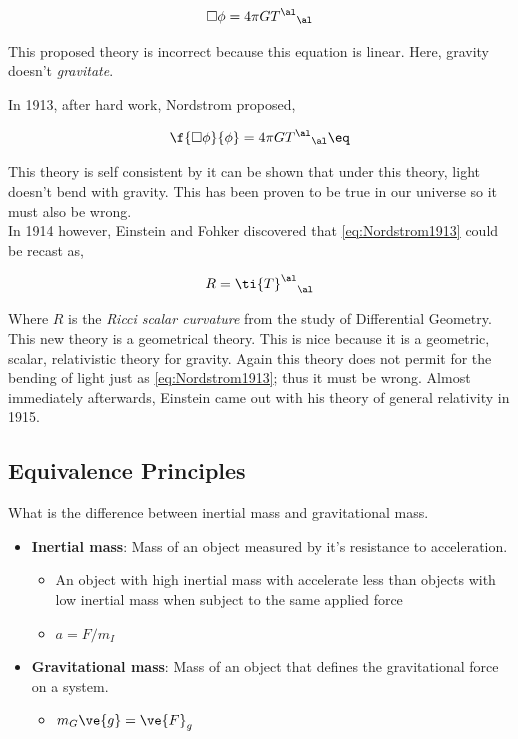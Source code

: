 \documentclass{article}
\begin{document}
\[ \Box \phi = 4 \pi G {T^{\al}}_{\al} \]

This proposed theory is incorrect because this equation is linear. Here, gravity doesn't \textit{gravitate}.

In 1913, after hard work, Nordstrom proposed,

\[ \f{\Box \phi}{\phi} = 4 \pi G {T^{\al}}_{\al} \eq \label{eq:Nordstrom1913}\]

This theory is self consistent by it can be shown that under this theory, light doesn't bend with gravity. This has been proven to be true in our universe so it must also be wrong. \\

In 1914 however, Einstein and Fohker discovered that \eqref{eq:Nordstrom1913} could be recast as,

\[ R = {\ti{T}^{\al}}_\al \]

Where $R$ is the \textit{Ricci scalar curvature} from the study of Differential Geometry. This new theory is a geometrical theory. This is nice because it is a geometric, scalar, relativistic theory for gravity. Again this theory does not permit for the bending of light just as \eqref{eq:Nordstrom1913}; thus it must be wrong. Almost immediately afterwards, Einstein came out with his theory of general relativity in 1915.

\subsection{Equivalence Principles}

What is the difference between inertial mass and gravitational mass.

\begin{itemize}
    \item \textbf{Inertial mass}: Mass of an object measured by it's resistance to acceleration.
    \begin{itemize}
        \item An object with high inertial mass with accelerate less than objects with low inertial mass when subject to the same applied force
        \item $a = F / m_I$
    \end{itemize}
    \item \textbf{Gravitational mass}: Mass of an object that defines the gravitational force on a system.
    \begin{itemize}
        \item $m_G \ve{g} = \ve{F}_g$
    \end{itemize}
\end{itemize}
\end{document}
